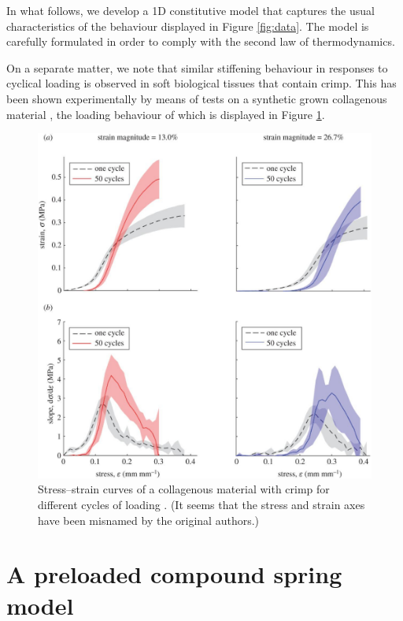 \documentclass{article}
\begin{document}
In what follows, we develop a 1D constitutive model that captures the usual characteristics of the behaviour displayed in Figure \ref{fig:data}. The model is carefully formulated in order to comply with the second law of thermodynamics. 

On a separate matter, we note that similar stiffening behaviour in responses to cyclical loading is observed in soft biological tissues that contain crimp. This has been shown experimentally by means of tests on a synthetic grown collagenous material \cite{susilo2016collagen}, the loading behaviour of which is displayed in Figure \ref{fig:collagen}.
\begin{figure}[!htb]
	\centering
	\includegraphics[width=0.7\linewidth]{collagen-stiffening}
	\caption{Stress--strain curves of a collagenous material with crimp for different cycles of loading \cite{susilo2016collagen}. (It seems that the stress and strain axes have been misnamed by the original authors.)}
	\label{fig:collagen}
\end{figure}

\section{A preloaded compound spring model}
\end{document}
